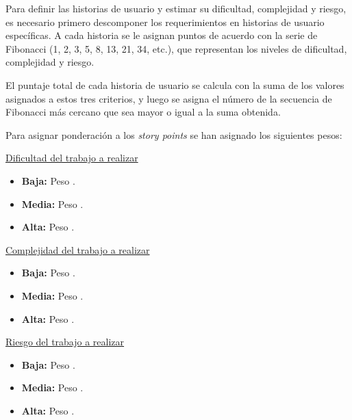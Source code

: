 Para definir las historias de usuario y estimar su dificultad, complejidad y riesgo, es necesario primero descomponer los requerimientos en historias de
usuario específicas. A cada historia se le asignan puntos de acuerdo con la serie de Fibonacci (1, 2, 3, 5, 8, 13, 21, 34, etc.), que representan los niveles
de dificultad, complejidad y riesgo.

El puntaje total de cada historia de usuario se calcula con la suma de los valores asignados a estos tres criterios, y luego se asigna el número de la
secuencia de Fibonacci más cercano que sea mayor o igual a la suma obtenida. 

Para asignar ponderación a los \textit{story points} se han asignado los siguientes pesos:

\underline{Dificultad del trabajo a realizar}
\begin{itemize}
	\item \textbf{Baja:} Peso .
	\item \textbf{Media:} Peso .
	\item \textbf{Alta:} Peso .
\end{itemize}

\underline{Complejidad del trabajo a realizar}
\begin{itemize}
	\item \textbf{Baja:} Peso .
	\item \textbf{Media:} Peso .
	\item \textbf{Alta:} Peso .
\end{itemize}

\underline{Riesgo del trabajo a realizar}
\begin{itemize}
	\item \textbf{Baja:} Peso .
	\item \textbf{Media:} Peso .
	\item \textbf{Alta:} Peso .
\end{itemize}

\pagebreak

